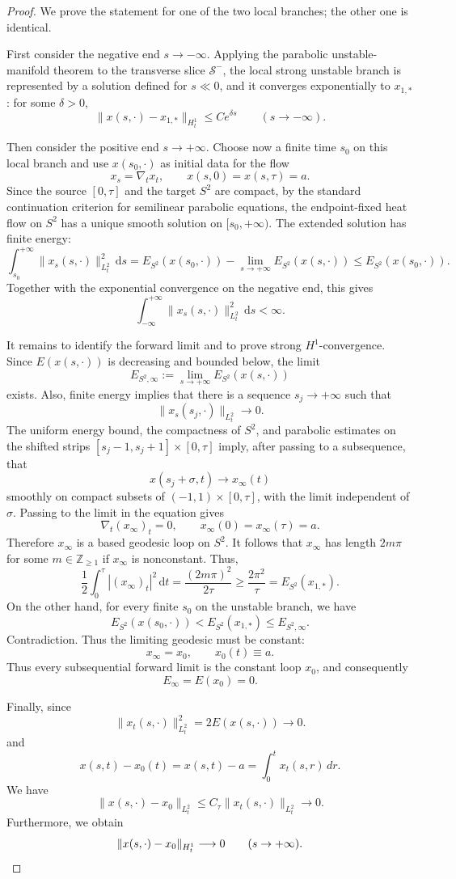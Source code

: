 \documentclass[11pt]{amsart}
\theoremstyle{plain}
\theoremstyle{definition}
\newcommand{\Z}{\mathbb Z}
\newcommand{\dd}{\mathrm d}
\begin{document}
\begin{proof}
We prove the statement for one of the two local branches; the other one is identical.

First consider the negative end $s\rightarrow-\infty$. Applying the parabolic unstable-manifold theorem to the transverse slice $\mathcal S^-$, the local strong unstable branch is represented by
a solution defined for $s\ll0$, and it converges exponentially to $x_{1,*}$: for some $\delta>0$,
\[
\|x(s,\cdot)-x_{1,*}\|_{H^1_t}\le Ce^{\delta s}
\qquad (s\to-\infty).
\]


Then consider the positive end $s\rightarrow+\infty$. Choose now a finite time $s_0$ on this local branch and use $x(s_0,\cdot)$ as initial
data for the 
flow
\[
x_s=\nabla_t x_t,\qquad x(s,0)=x(s,\tau)=a.
\]
Since the source $[0,\tau]$ and the target $S^2$ are compact, by the standard continuation criterion
for semilinear parabolic equations, the endpoint-fixed heat flow on $S^2$ has a unique smooth solution on $[s_0,+\infty)$. The extended solution has finite energy:
\[
\int_{s_0}^{+\infty}\|x_s(s,\cdot)\|_{L^2_t}^2\,\dd s=
E_{S^2}(x(s_0,\cdot))-\lim_{s\to+\infty}E_{S^2}(x(s,\cdot))\le E_{S^2}(x(s_0,\cdot)).
\]
Together with the exponential convergence on the negative end, this gives
\[
\int_{-\infty}^{+\infty}\|x_s(s,\cdot)\|_{L^2_t}^2\,\dd s<\infty.
\]

It remains to identify the forward limit and to prove strong $H^1$-convergence. Since
$E(x(s,\cdot))$ is decreasing and bounded below, the limit
\[
E_{S^2,\infty}:=\lim_{s\to+\infty}E_{S^2}(x(s,\cdot))
\]
exists. Also, finite energy implies that there is a sequence $s_j\to+\infty$ such that
\[
\|x_s(s_j,\cdot)\|_{L^2_t}\longrightarrow0.
\]
The uniform energy bound, the compactness of $S^2$, and parabolic estimates on the
shifted strips $[s_j-1,s_j+1]\times[0,\tau]$ imply, after passing to a subsequence, that
\[
x(s_j+\sigma,t)\longrightarrow x_\infty(t)
\]
smoothly on compact subsets of $(-1,1)\times[0,\tau]$, with the limit independent of
$\sigma$. Passing to the limit in the equation gives
\[
\nabla_t (x_\infty)_t=0,\qquad x_\infty(0)=x_\infty(\tau)=a.
\]
Therefore $x_\infty$ is a based geodesic loop on $S^2$. It follows that $x_{\infty}$ has length $2m\pi$ for some $m\in\Z_{\ge1}$ if $x_{\infty}$ is nonconstant. Thus,
\[
\frac12\int_0^\tau |(x_\infty)_t|^2\,\dd t
=\frac{(2m\pi)^2}{2\tau}
\ge
\frac{2\pi^2}{\tau}=E_{S^2}(x_{1,*}).
\]
On the other hand,  for every finite
$s_0$ on the unstable branch, we have 
\[
E_{S^2}(x(s_0,\cdot))<E_{S^2}(x_{1,*})\le E_{S^2,\infty}.
\]
Contradiction. Thus the limiting geodesic must be constant:
\[
x_\infty=x_0,\qquad x_0(t)\equiv a.
\]
Thus every subsequential forward limit is the constant loop $x_0$, and consequently
\[
E_\infty=E(x_0)=0.
\]

Finally, since 
\[
\|x_t(s,\cdot)\|_{L^2_t}^2=2E(x(s,\cdot))\longrightarrow0.
\]
and 
\[
x(s,t)-x_0(t)=x(s,t)-a=\int_0^t x_t(s,r)\,dr.
\]
We have
\[
\|x(s,\cdot)-x_0\|_{L^2_t}
\le
C_\tau \|x_t(s,\cdot)\|_{L^2_t}
\longrightarrow0.
\]
Furthermore, we obtain
\[
\|x(s,\cdot)-x_0\|_{H^1_t}\longrightarrow0
\qquad (s\to+\infty). \qedhere
\]
\end{proof}
\end{document}

